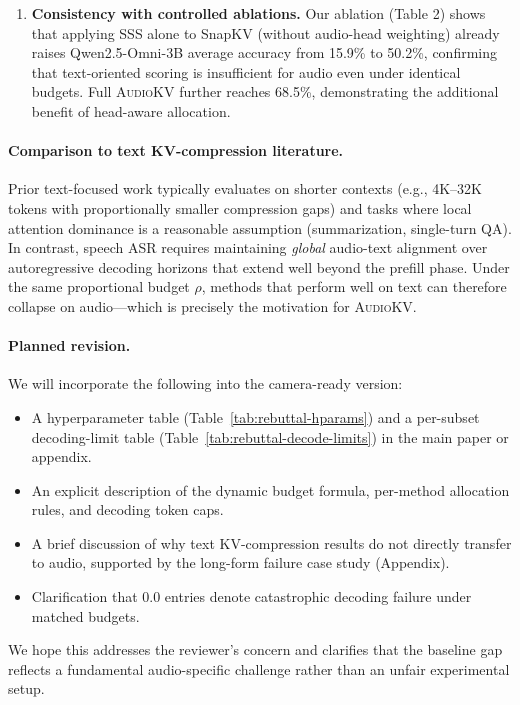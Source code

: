 \begin{answer}
\begin{enumerate}
        \item \textbf{Consistency with controlled ablations.}
        Our ablation (Table 2) shows that applying SSS alone to SnapKV (without audio-head weighting) already raises Qwen2.5-Omni-3B average accuracy from 15.9\% to 50.2\%, confirming that text-oriented scoring is insufficient for audio even under identical budgets.
        Full \textsc{AudioKV} further reaches 68.5\%, demonstrating the additional benefit of head-aware allocation.
    \end{enumerate}
    
    \paragraph{Comparison to text KV-compression literature.}
    Prior text-focused work typically evaluates on shorter contexts (e.g., 4K--32K tokens with proportionally smaller compression gaps) and tasks where local attention dominance is a reasonable assumption (summarization, single-turn QA).
    In contrast, speech ASR requires maintaining \emph{global} audio-text alignment over autoregressive decoding horizons that extend well beyond the prefill phase.
    Under the same proportional budget $\rho$, methods that perform well on text can therefore collapse on audio---which is precisely the motivation for \textsc{AudioKV}.
    
    \paragraph{Planned revision.}
    We will incorporate the following into the camera-ready version:
    \begin{itemize}
        \item A hyperparameter table (Table~\ref{tab:rebuttal-hparams}) and a per-subset decoding-limit table (Table~\ref{tab:rebuttal-decode-limits}) in the main paper or appendix.
        \item An explicit description of the dynamic budget formula, per-method allocation rules, and decoding token caps.
        \item A brief discussion of why text KV-compression results do not directly transfer to audio, supported by the long-form failure case study (Appendix).
        \item Clarification that 0.0 entries denote catastrophic decoding failure under matched budgets.
    \end{itemize}
    
    We hope this addresses the reviewer's concern and clarifies that the baseline gap reflects a fundamental audio-specific challenge rather than an unfair experimental setup.
    
    \end{answer}
    